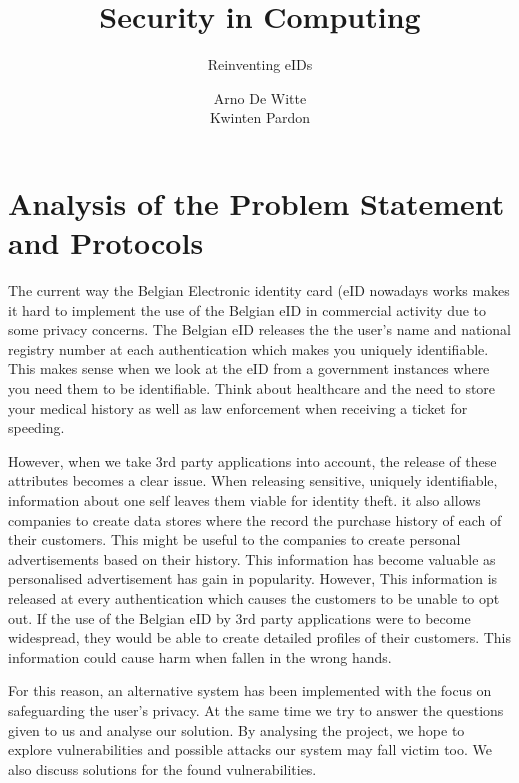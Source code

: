 \documentclass[12pt]{report}
\begin{document}
\title{Security in Computing}
\subtitle{Reinventing eIDs}
\author{Arno De Witte \\Kwinten Pardon}

\maketitle

\listoftodos

\section{Analysis of the Problem Statement and Protocols}
The current way the Belgian Electronic identity card (eID nowadays works makes it hard to implement the use of the Belgian eID in commercial activity due to some privacy concerns. The Belgian eID releases the the user's name and national registry number at each authentication which makes you uniquely identifiable. This makes sense when we look at the eID from a government instances where you need them to be identifiable. Think about healthcare and the need to store your medical history as well as law enforcement when receiving a ticket for speeding.

However, when we take 3rd party applications into account, the release of these attributes becomes a clear issue. When releasing sensitive, uniquely identifiable, information about one self leaves them viable for identity theft. it also allows companies to create data stores where the record the purchase history of each of their customers. This might be useful to the companies to create personal advertisements based on their history. This information has become valuable as personalised advertisement has gain in popularity. However, This information is released at every authentication which causes the customers to be unable to opt out. If the use of the Belgian eID by 3rd party applications were to become widespread, they would be able to create detailed profiles of their customers. This information could cause harm when fallen in the wrong hands.

For this reason, an alternative system has been implemented with the focus on safeguarding the user's privacy. At the same time we try to answer the questions given to us and analyse our solution. By analysing the project, we hope to explore vulnerabilities and possible attacks our system may fall victim too. We also discuss solutions for the found vulnerabilities.
\end{document}
